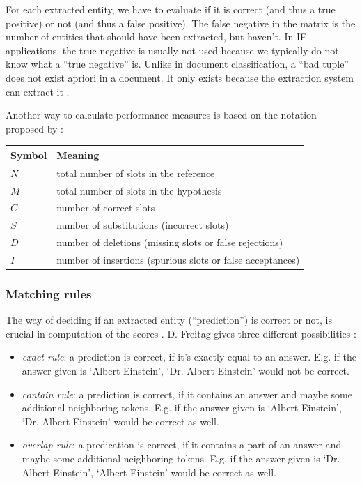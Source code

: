 For each extracted entity, we have to evaluate if it is correct (and thus a true positive) or not (and thus a false positive). The false negative in the matrix is the number of entities that should have been extracted, but haven't. In IE applications, the true negative is usually not used \cite{Sitter:2004} because we typically do not know what a \enquote{true negative} is. Unlike in document classification, a \enquote{bad tuple} does not exist apriori in a document. It only exists because the extraction system can extract it \cite{Ipeirotis:2007}.

Another way to calculate performance measures is based on the notation proposed by \citeauthor{Makhoul:1999} \cite{Makhoul:1999}:

\begin{table}[H]
\centering
\begin{tabular*}{\textwidth}{ll}
	\toprule
	\textbf{Symbol} & \textbf{Meaning} \\
	\midrule
	$N$ & total number of slots in the reference \\
	$M$ & total number of slots in the hypothesis \\
	$C$ & number of correct slots \\
	$S$ & number of substitutions (incorrect slots) \\
	$D$ & number of deletions (missing slots or false rejections) \\
	$I$ & number of insertions (spurious slots or false acceptances) \\
	\bottomrule
\end{tabular*}
\end{table}

\subsubsection{Matching rules}
\label{sec:matching-rules}
The way of deciding if an extracted entity (\enquote{prediction}) is correct or not, is crucial in computation of the scores \cite{Sitter:2004}. D. Freitag gives three different possibilities \cite{Freitag:1998}:

\begin{itemize}
	\item \textit{exact rule}: a prediction is correct, if it's exactly equal to an answer. E.g. if the answer given is \enquote*{Albert Einstein}, \enquote*{Dr. Albert Einstein} would not be correct.
	\item \textit{contain rule}: a prediction is correct, if it contains an answer and maybe some additional neighboring tokens. E.g. if the answer given is \enquote*{Albert Einstein}, \enquote*{Dr. Albert Einstein} would be correct as well.
	\item \textit{overlap rule}: a predication is correct, if it contains a part of an answer and maybe some additional neighboring tokens. E.g. if the answer given is \enquote*{Dr. Albert Einstein}, \enquote*{Albert Einstein} would be correct as well.
\end{itemize}

